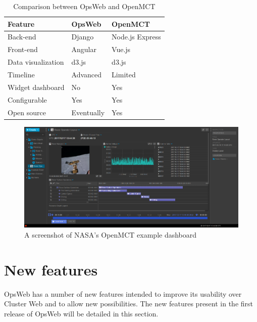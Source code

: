 \begin{table}[!ht]
\def\arraystretch{1.1}%
    \begin{center}
    \caption{Comparison between OpsWeb and OpenMCT}
    \label{openmct_opsweb_comparison}
    \begin{tabular}{| l | l | l | }
    \hline
    Feature & OpsWeb & OpenMCT  \\
    \hline
    Back-end    &  Django & Node.js Express      \\
    Front-end    & Angular &  Vue.js     \\
    Data visualization   & d3.js &  d3.js     \\
    Timeline    &  Advanced &  Limited     \\
    Widget dashboard    &  No &  Yes      \\
    Configurable    &  Yes &  Yes      \\
    Open source    &  Eventually &  Yes      \\
    \hline
    \end{tabular}
    \end{center}
\end{table}

\begin{figure}[ht]
  \begin{center}
    \includegraphics*[width=1\textwidth]{openmct}
  \end{center}
  \caption{A screenshot of NASA's OpenMCT example dashboard}
  \label{fig:openmct}
\end{figure}

\section{New features}
OpsWeb has a number of new features intended to improve its usability over Cluster Web and to allow new possibilities. The new features present in the first release of OpsWeb will be detailed in this section.

